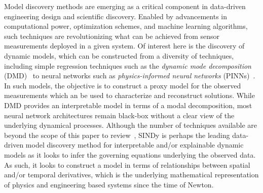 \documentclass{article}
\begin{document}

Model discovery methods are emerging as a critical component in data-driven engineering design and scientific discovery.  Enabled by advancements in computational power, optimization schemes, and machine learning algorithms, such techniques are revolutionizing what can be achieved from sensor measurements deployed in a given system.  Of interest here is the discovery of dynamic models, which can be constructed from a diversity of techniques, including simple regression techniques such as the {\em dynamic mode decomposition} (DMD)~\cite{kutz2016dynamic,Ichinaga2024} to
neural networks such as {\em physics-informed neural networks} (PINNs)~\cite{Raissi2019}.  In such models, the objective is to construct a proxy model for the observed measurements which an be used to characterize and reconstruct solutions.  While DMD provides an interpretable model in terms of a modal decomposition, most neural network architectures remain black-box without a clear view of the underlying dynamical processes.  Although the number of techniques available are beyond the scope of this paper to review~\cite{cuomo2022scientific}, SINDy is perhaps the leading data-driven model discovery method for interpretable and/or explainable dynamic models as it looks to infer the governing equations underlying the observed data.  As such, it looks to construct a model in terms of relationships between spatial and/or temporal derivatives, which is the underlying mathematical representation of physics and engineering based systems since the time of Newton.
\end{document}
